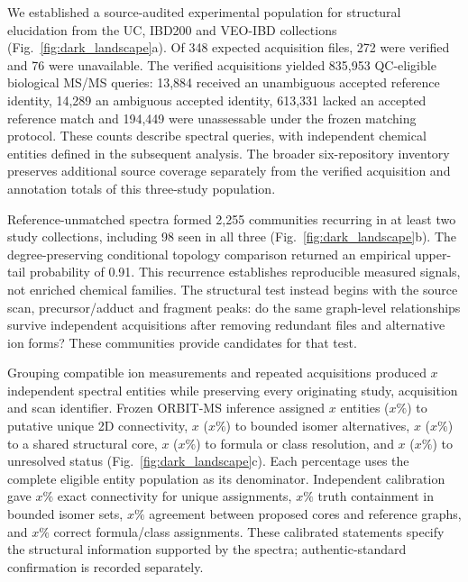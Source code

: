 \documentclass[11pt]{article}
\newcommand{\pending}[1]{\ensuremath{x}}
\begin{document}
We established a source-audited experimental population for structural elucidation from the UC, IBD200 and VEO-IBD collections (Fig.~\ref{fig:dark_landscape}a). Of 348 expected acquisition files, 272 were verified and 76 were unavailable. The verified acquisitions yielded 835,953 QC-eligible biological MS/MS queries: 13,884 received an unambiguous accepted reference identity, 14,289 an ambiguous accepted identity, 613,331 lacked an accepted reference match and 194,449 were unassessable under the frozen matching protocol. These counts describe spectral queries, with independent chemical entities defined in the subsequent analysis. The broader six-repository inventory preserves additional source coverage separately from the verified acquisition and annotation totals of this three-study population.

Reference-unmatched spectra formed 2,255 communities recurring in at least two study collections, including 98 seen in all three (Fig.~\ref{fig:dark_landscape}b). The degree-preserving conditional topology comparison returned an empirical upper-tail probability of 0.91. This recurrence establishes reproducible measured signals, not enriched chemical families. The structural test instead begins with the source scan, precursor/adduct and fragment peaks: do the same graph-level relationships survive independent acquisitions after removing redundant files and alternative ion forms? These communities provide candidates for that test.

Grouping compatible ion measurements and repeated acquisitions produced \(\pending{r1-01}\) independent spectral entities while preserving every originating study, acquisition and scan identifier. Frozen ORBIT-MS inference assigned \(\pending{r1-02}\) entities (\(\pending{r1-03}\%\)) to putative unique 2D connectivity, \(\pending{r1-04}\) (\(\pending{r1-05}\%\)) to bounded isomer alternatives, \(\pending{r1-06}\) (\(\pending{r1-07}\%\)) to a shared structural core, \(\pending{r1-08}\) (\(\pending{r1-09}\%\)) to formula or class resolution, and \(\pending{r1-10}\) (\(\pending{r1-11}\%\)) to unresolved status (Fig.~\ref{fig:dark_landscape}c). Each percentage uses the complete eligible entity population as its denominator. Independent calibration gave \(\pending{r1-12}\%\) exact connectivity for unique assignments, \(\pending{r1-13}\%\) truth containment in bounded isomer sets, \(\pending{r1-14}\%\) agreement between proposed cores and reference graphs, and \(\pending{r1-15}\%\) correct formula/class assignments. These calibrated statements specify the structural information supported by the spectra; authentic-standard confirmation is recorded separately.
\end{document}
